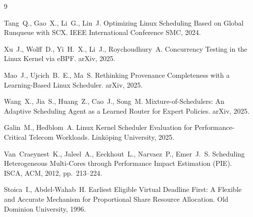 \documentclass[12pt, oneside]{book}
\begin{document}
\newpage
\renewcommand{\bibname}{\Large Список использованных источников}
\begin{thebibliography}{9}
        \vspace*{0.3cm}

        Tang~Q., Gao~X., Li~G., Lin~J.
        Optimizing Linux Scheduling Based on Global Runqueue with SCX.
        IEEE International Conference SMC, 2024.

        Xu~J., Wolff~D., Yi~H.~X., Li~J., Roychoudhury~A.
        Concurrency Testing in the Linux Kernel via eBPF.
        arXiv, 2025.

        Mao~J., Ujcich~B.~E., Ma~S.
        Rethinking Provenance Completeness with a Learning-Based
        Linux Scheduler.
        arXiv, 2025.

        Wang~X., Jia~S., Huang~Z., Cao~J., Song~M.
        Mixture-of-Schedulers: An Adaptive Scheduling Agent as a
        Learned Router for Expert Policies.
        arXiv, 2025.

        Galin~M., Hedblom~A.
        Linux Kernel Scheduler Evaluation for Performance-Critical
        Telecom Workloads.
        Linköping University, 2025.

        Van~Craeynest~K., Jaleel~A., Eeckhout~L., Narvaez~P., Emer~J.~S.
        Scheduling Heterogeneous Multi-Cores through Performance Impact
        Estimation (PIE).
        ISCA, ACM, 2012, pp.~213--224.

        Stoica~I., Abdel-Wahab~H.
        Earliest Eligible Virtual Deadline First: A Flexible and Accurate
        Mechanism for Proportional Share Resource Allocation.
        Old Dominion University, 1996.
\end{thebibliography}
\end{document}
